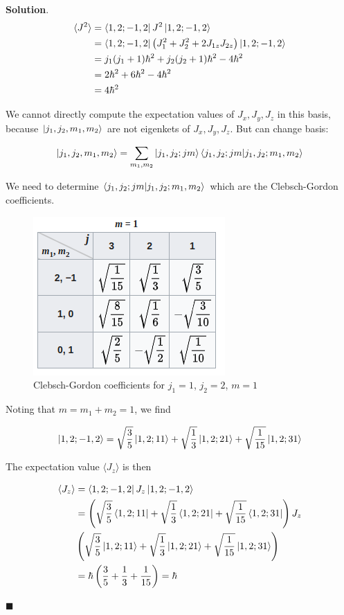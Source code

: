 \documentclass[12pt]{article}
\theoremstyle{definition}
\newenvironment{s}{%
        \begin{trivlist} \item \textbf{Solution}. }{%
            \hspace*{\fill} $\blacksquare$\end{trivlist}}%
\begin{document}
{\begin{s}
\begin{align*}
\langle J^{2} \rangle &= \bra{1,2;-1,2}J^{2}\ket{1,2;-1,2}\\
&= \bra{1,2;-1,2}\left(J_{1}^{2}+J_{2}^{2} + 2J_{1z}J_{2z}\right)\ket{1,2;-1,2}\\
&= j_{1}(j_{1}+1)\hbar^{2} + j_{2}(j_{2}+1)\hbar^{2} - 4\hbar^{2}\\
&= 2\hbar^{2} + 6\hbar^{2} - 4\hbar^{2}\\
&= 4\hbar^{2}
\end{align*}

We cannot directly compute the expectation values of $J_x, J_y, J_z$ in this basis, because $\ket{j_1, j_2, m_1, m_2}$ are not eigenkets of $J_x, J_y, J_z$. But can change basis:

\begin{align*}
\ket{j_1, j_2, m_1, m_2} = \sum_{m_1,m_2} \ket{j_1,j_2; jm}\bra{j_1,j_2; jm}\ket{j_{1}, j_{2}; m_{1},m_{2}}
\end{align*}

We need to determine $\bra{j_1,j_2; jm}\ket{j_{1}, j_{2}; m_{1},m_{2}}$ which are the Clebsch-Gordon coefficients.

\begin{figure}
\centering
\includegraphics[scale=0.75]{cb-table.png}
\caption{Clebsch-Gordon coefficients for $j_{1} = 1$, $j_{2} = 2$, $m=1$}
\end{figure}

Noting that $m = m_1 + m_2 = 1$, we find

\begin{align*}
\ket{1,2;-1,2} = \sqrt{\frac{3}{5}}\ket{1,2;1 1} + \sqrt{\frac{1}{3}}\ket{1,2;2 1} + \sqrt{\frac{1}{15}}\ket{1,2;3 1}
\end{align*}

The expectation value $\langle J_z \rangle$ is then

\begin{align*}
\langle J_z \rangle &= \bra{1,2;-1,2} J_z \ket{1,2;-1,2} \\
&= \left(\sqrt{\frac{3}{5}}\bra{1,2;1 1} + \sqrt{\frac{1}{3}}\bra{1,2;2 1} + \sqrt{\frac{1}{15}}\bra{1,2;3 1}\right)J_{z}\\
&\left(\sqrt{\frac{3}{5}}\ket{1,2;1 1} + \sqrt{\frac{1}{3}}\ket{1,2;2 1} + \sqrt{\frac{1}{15}}\ket{1,2;3 1}\right)\\
&= \hbar\left(\frac{3}{5}+\frac{1}{3}+\frac{1}{15}\right) = \hbar
\end{align*}


\end{s}}
\end{document}
